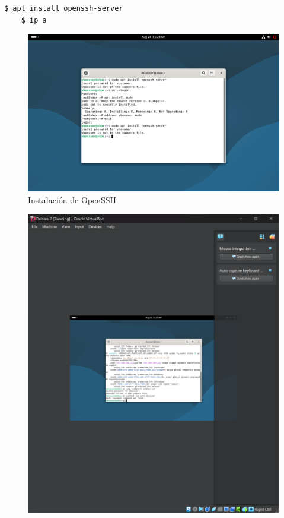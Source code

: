 \documentclass{article}
\begin{document}
\begin{enumerate}
    \begin{lstlisting}[language=bash]
    $ apt install openssh-server
    $ ip a
    \end{lstlisting}
    \begin{figure}
        \includegraphics[width=\linewidth]{./images/install-open-ssh.png}
        \caption{Instalación de OpenSSH}
    \end{figure}
    \begin{figure}
        \includegraphics[width=\linewidth]{./images/ipa.png}

\end{figure}
\end{enumerate}
\end{document}
